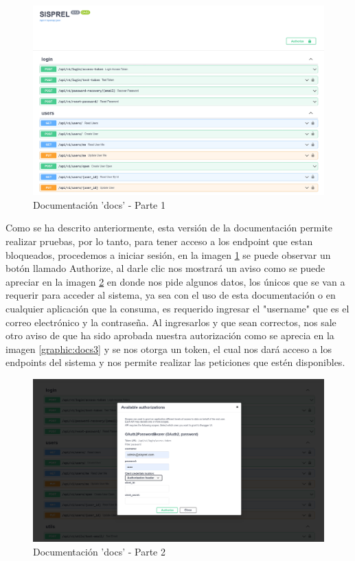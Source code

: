 \begin{figure}[!htb]
    \centering
    \includegraphics[scale=.20]{TT/img/implementacion/docs_1.png}
    \caption{Documentación 'docs' - Parte 1}
    \label{graphic:docs1}    
\end{figure}

Como se ha descrito anteriormente, esta versión de la documentación permite realizar pruebas, por lo tanto, para tener acceso a los endpoint que estan bloqueados, procedemos a iniciar sesión, en la imagen \ref{graphic:docs1} se puede observar un botón llamado Authorize, al darle clic nos mostrará un aviso como se puede apreciar en la imagen \ref{graphic:docs2} en donde nos pide algunos datos, los únicos que se van a requerir para acceder al sistema, ya sea con el uso de esta documentación o en cualquier aplicación que la consuma, es requerido ingresar el "username" que es el correo electrónico y la contraseña. Al ingresarlos y que sean correctos, nos sale otro aviso de que ha sido aprobada nuestra autorización  como se aprecia en la imagen \ref{graphic:docs3} y se nos otorga un token, el cual nos dará acceso a los endpoints del sistema y nos permite realizar las peticiones que estén disponibles.

\begin{figure}[!htb]
    \centering
    \includegraphics[scale=.20]{TT/img/implementacion/docs_2.png}
    \caption{Documentación 'docs' - Parte 2}
    \label{graphic:docs2}    
\end{figure}

